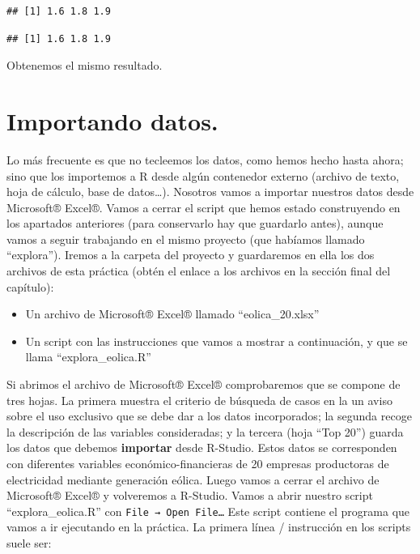\documentclass[
]{book}
\newenvironment{Shaded}{\begin{snugshade}}{\end{snugshade}}
\newcommand{\NormalTok}[1]{#1}
\newcommand{\SpecialCharTok}[1]{\textcolor[rgb]{0.81,0.36,0.00}{\textbf{#1}}}
\begin{document}
\begin{verbatim}
## [1] 1.6 1.8 1.9
\end{verbatim}

\begin{Shaded}
\end{Shaded}

\begin{verbatim}
## [1] 1.6 1.8 1.9
\end{verbatim}

Obtenemos el mismo resultado.

\section{Importando datos.}\label{importando-datos.}

Lo más frecuente es que no tecleemos los datos, como hemos hecho hasta ahora; sino que los importemos a R desde algún contenedor externo (archivo de texto, hoja de cálculo, base de datos\ldots). Nosotros vamos a importar nuestros datos desde Microsoft® Excel®. Vamos a cerrar el script que hemos estado construyendo en los apartados anteriores (para conservarlo hay que guardarlo antes), aunque vamos a seguir trabajando en el mismo proyecto (que habíamos llamado ``explora''). Iremos a la carpeta del proyecto y guardaremos en ella los dos archivos de esta práctica (obtén el enlace a los archivos en la sección final del capítulo):

\begin{itemize}
\item
  Un archivo de Microsoft® Excel® llamado ``eolica\_20.xlsx''
\item
  Un script con las instrucciones que vamos a mostrar a continuación, y que se llama ``explora\_eolica.R''
\end{itemize}

Si abrimos el archivo de Microsoft® Excel® comprobaremos que se compone de tres hojas. La primera muestra el criterio de búsqueda de casos en la un aviso sobre el uso exclusivo que se debe dar a los datos incorporados; la segunda recoge la descripción de las variables consideradas; y la tercera (hoja ``Top 20'') guarda los datos que debemos \textbf{importar} desde R-Studio. Estos datos se corresponden con diferentes variables económico-financieras de 20 empresas productoras de electricidad mediante generación eólica. Luego vamos a cerrar el archivo de Microsoft® Excel® y volveremos a R-Studio. Vamos a abrir nuestro script ``explora\_eolica.R'' con \texttt{File\ →\ Open\ File…} Este script contiene el programa que vamos a ir ejecutando en la práctica. La primera línea / instrucción en los scripts suele ser:
\end{document}
